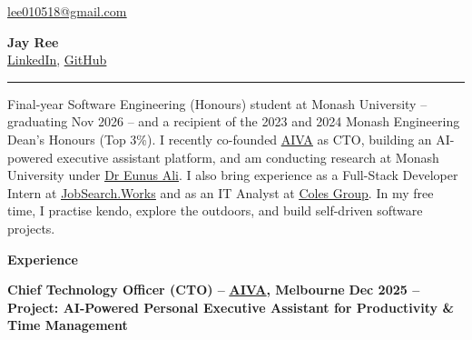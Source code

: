 \documentclass[11pt, a4paper]{article}
\let\hrefnoul\href
\renewcommand{\href}[2]{\hrefnoul{#1}{\ul{#2}}}
\newcommand{\resumesection}[1]{%
  \vspace{8pt}\par
  {\setlength{\fboxsep}{5pt}%
   \noindent\colorbox{sectionbg}{%
     \parbox{\dimexpr\linewidth-10pt\relax}{\strut\textbf{\large #1}\strut}%
   }}%
  \vspace{2pt}\par
}
\begin{document}

\noindent
\begin{minipage}[c]{0.25\textwidth}
  \href{mailto:lee010518@gmail.com}{lee010518@gmail.com}
\end{minipage}%
\begin{minipage}[c]{0.50\textwidth}
  \centering
  {\fontsize{26}{30}\selectfont\textbf{Jay Ree}}\\[3pt]
  \href{https://www.linkedin.com/in/jaeyun-ree-75b17b26b/}{LinkedIn},%
  \href{https://github.com/JayReeMarine/}{GitHub}%
\end{minipage}%
\begin{minipage}[c]{0.25\textwidth}
\end{minipage}

\vspace{4pt}
{\color{linkblue}\rule{\linewidth}{1.2pt}}
\vspace{2pt}

Final-year Software Engineering (Honours) student at Monash University -- graduating Nov 2026 -- and a recipient of the 2023 and 2024 Monash Engineering Dean's Honours (Top 3\%). I recently co-founded \href{https://tryaiva.app/}{AIVA} as CTO, building an AI-powered executive assistant platform, and am conducting research at Monash University under \href{https://research.monash.edu/en/persons/eunus-ali}{Dr Eunus Ali}. I also bring experience as a Full-Stack Developer Intern at \href{https://www.linkedin.com/company/job-search-works/posts/?feedView=all}{JobSearch.Works} and as an IT Analyst at \href{https://www.linkedin.com/company/colesgroup/posts/?feedView=all}{Coles Group}. In my free time, I practise kendo, explore the outdoors, and build self-driven software projects.

\resumesection{Experience}

\noindent\textbf{Chief Technology Officer (CTO) –}
\href{https://tryaiva.app/}{\textbf{AIVA}}\textbf{, Melbourne}%
\hfill\textbf{Dec 2025 –}\\
\textbf{Project: AI-Powered Personal Executive Assistant for Productivity \& Time Management}
\end{document}
